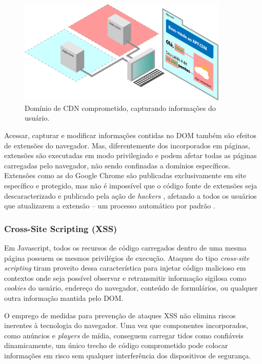 \begin{figure}
	\centering
	\includegraphics[width=10cm]{diagramas/diagrama02.pdf}
	\caption{Domínio de CDN comprometido, capturando informações do usuário.}
	\label{Fig: diagrama02}
\end{figure}

Acessar, capturar e modificar informações contidas no DOM também são efeitos de extensões do navegador. Mas, diferentemente dos \scripts incorporados em páginas, extensões são executadas em modo privilegiado e podem afetar todas as páginas carregadas pelo navegador, não sendo confinadas a domínios específicos. Extensões como as do Google Chrome são publicadas exclusivamente em site específico e protegido, mas não é impossível que o código fonte de extensões seja descaracterizado e publicado pela ação de \textit{hackers} \cite{Spring2017}, afetando a todos os usuários que atualizarem a extensão -- um processo automático por padrão \cite{Google2017}.


\subsubsection{Cross-Site Scripting (XSS)}
Em Javascript, todos os recursos de código carregados dentro de uma mesma página possuem os mesmos privilégios de execução. Ataques do tipo \textit{cross-site scripting} tiram proveito dessa característica para injetar código malicioso em contextos onde seja possível observar e retransmitir informação sigilosa como \textit{cookies} do usuário, endereço do navegador, conteúdo de formulários, ou qualquer outra informação mantida pelo DOM.

O emprego de medidas para prevenção de ataques XSS \cite{OWASP:XSS-CheatSheet} não elimina riscos inerentes à tecnologia do navegador. Uma vez que componentes incorporados, como anúncios e \textit{players} de mídia, conseguem carregar \scripts tidos como confiáveis dinamicamente, um único trecho de código comprometido pode colocar informações em risco sem qualquer interferência dos dispositivos de segurança.

